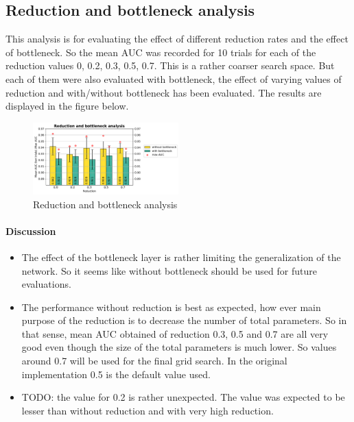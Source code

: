 \subsection{Reduction and bottleneck analysis}
This analysis is for evaluating the effect of different reduction rates and the effect of bottleneck. So the mean AUC was recorded for 10 trials for each of the reduction values 0, 0.2, 0.3, 0.5, 0.7. This is a rather coarser 
search space. But each of them were also evaluated with bottleneck, the effect of varying values of reduction and with/without bottleneck has been evaluated. The results are displayed in the figure below. 
\begin{figure}[ht]
\centering
\includegraphics[width=0.5\textwidth]{images/densenet/simple/densenet_simple_reduction_bottleneck}
\caption{\label{fig:densenet_simple_reduction_bottleneck}Reduction and bottleneck analysis}
\end{figure}

\paragraph{Discussion\\}
\begin{itemize}
 \item The effect of the bottleneck layer is rather limiting the generalization of the network. So it seems like without bottleneck should be used for future evaluations.
 \item The performance without reduction is best as expected, how ever main purpose of the reduction is to decrease the number of total parameters. So in that sense, mean AUC obtained of reduction 0.3, 0.5 and 0.7 are all very 
 good even though the size of the total parameters is much lower. So values around 0.7 will be used for the final grid search. In the original implementation 0.5 is the default value used.
 \item TODO: the value for 0.2 is rather unexpected. The value was expected to be lesser than without reduction and with very high reduction.
\end{itemize}


